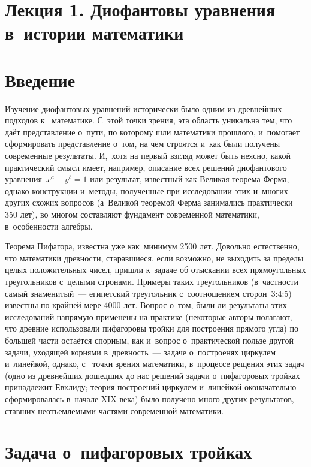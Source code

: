 \documentclass{article}
\begin{document}
\section*{Лекция 1. Диофантовы уравнения в~истории математики}
\resetcntrs

\section{Введение}

Изучение диофантовых уравнений исторически было одним из древнейших подходов к~
математике. С~этой точки зрения, эта область уникальна тем, что даёт
представление о~пути, по которому шли математики прошлого, и~помогает
сформировать представление о~том, на чем строятся и~как были получены
современные результаты. И,~хотя на первый взгляд может быть неясно, какой
практический смысл имеет, например, описание всех решений диофантового
уравнения~$x^a-y^b=1$ или результат, известный как Великая теорема Ферма,
однако конструкции и~методы, полученные при исследовании этих и~многих других
схожих вопросов (а~Великой теоремой Ферма занимались практически 350 лет), во
многом составляют фундамент современной математики, в~особенности алгебры.

Теорема Пифагора, известна уже как~минимум 2500 лет. Довольно естественно, что
математики древности, старавшиеся, если возможно, не выходить за пределы целых
положительных чисел, пришли к~задаче об отыскании всех прямоугольных
треугольников с~целыми стронами. Примеры таких треугольников (в~частности самый
знаменитый~--- египетский треугольник с~соотношением сторон~3:4:5) известны по
крайней мере 4000 лет. Вопрос о~том, были ли результаты этих исследований
напрямую применены на практике (некоторые авторы полагают, что древние
использовали пифагоровы тройки для построения прямого угла) по большей части
остаётся спорным, как и~вопрос о~практической пользе другой задачи, уходящей
корнями в~древность~--- задаче о~построенях циркулем и~линейкой, однако, с~
точки зрения математики, в~процессе рещения этих задач (одно из древнейших
дошедших до нас решений задачи о~пифагоровых тройках принадлежит Евклиду; теория
построений циркулем и~линейкой оконачательно сформировалась в~начале XIX века)
было получено много других результатов, ставших неотъемлемыми частями
современной математики.


\section{Задача о~пифагоровых тройках}
\end{document}
